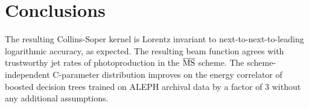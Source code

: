\section{Conclusions}\label{sec:conclusions}

The resulting Collins-Soper kernel is Lorentz invariant to
next-to-next-to-leading logarithmic accuracy, as expected. The resulting
beam function agrees with trustworthy jet rates of photoproduction in
the $\overline{\rm MS}$ scheme. The scheme-independent C-parameter
distribution improves on the energy correlator of boosted decision trees
trained on ALEPH archival data by a factor of 3 without any additional
assumptions.

